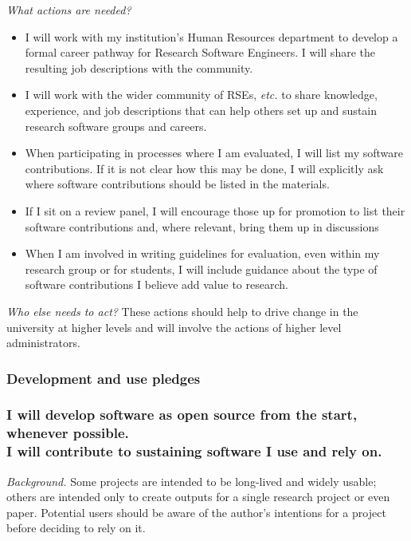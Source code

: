 \documentclass[a4paper,UKenglish]{dagman}
\renewcommand{\paragraph}[1]{\subsubsection*{#1}\xspace}
\newcommand{\etc}{\emph{etc.}\xspace}
\begin{document}
\emph{What actions are needed?}
\begin{itemize}
\item I will work with my institution's Human Resources department to develop a formal career pathway for Research Software Engineers. I will share the resulting job descriptions with the community.
\item I will work with the wider community of RSEs, \etc to share knowledge, experience, and job descriptions that can help others set up and sustain research software groups and careers.
\item When participating in processes where I am evaluated, I will list my software contributions.
If it is not clear how this may be done, I will explicitly ask where software contributions should be listed in the materials.
\item If I sit on a review panel, I will encourage those up for promotion to list their software contributions and, where relevant, bring them up in discussions
\item When I am involved in writing guidelines for evaluation, even within my research group or for students, I will include guidance about the type of software contributions I believe add value to research.
\end{itemize}

\emph{Who else needs to act?}
These actions should help to drive change in the university at higher levels and will involve the actions of higher level administrators.

\subsubsection*{Development and use pledges}

\paragraph{I will develop software as open source from the start, whenever possible. \\
I will contribute to sustaining software I use and rely on.}

\emph{Background.}
Some projects are intended to be long-lived and widely usable; others are intended only to create outputs for a single research project or even paper. Potential users should be aware of the author's intentions for a project before deciding to rely on it.
\end{document}
